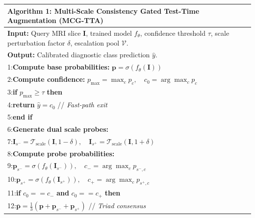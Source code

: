 \documentclass[journal]{IEEEtran}
\begin{document}
\begin{table}[h]
\centering
\begin{tabular}{p{}}
\toprule
\textbf{Algorithm 1: Multi-Scale Consistency Gated Test-Time Augmentation (MCG-TTA)} \\
\midrule
\textbf{Input:} Query MRI slice $\mathbf{I}$, trained model $f_\theta$, confidence threshold $\tau$, scale perturbation factor $\delta$, escalation pool $\mathcal{V}$. \\
\textbf{Output:} Calibrated diagnostic class prediction $\hat{y}$. \\
\midrule
1:\hspace{1em}\textbf{Compute base probabilities:} $\mathbf{p} = \sigma(f_\theta(\mathbf{I}))$ \\[0.2ex]
2:\hspace{1em}\textbf{Compute confidence:} $p_{\max} = \max_c p_c, \quad c_0 = \arg\max_c p_c$ \\[0.2ex]
3:\hspace{1em}\textbf{if} $p_{\max} \ge \tau$ \textbf{then} \\[0.2ex]
4:\hspace{2em}\textbf{return} $\hat{y} = c_0$ \hfill // \emph{Fast-path exit} \\[0.2ex]
5:\hspace{1em}\textbf{end if} \\[0.2ex]
6:\hspace{1em}\textbf{Generate dual scale probes:} \\[0.2ex]
7:\hspace{2em}$\mathbf{I}_{s^-} = \mathcal{T}_{\text{scale}}(\mathbf{I}, 1 - \delta), \quad \mathbf{I}_{s^+} = \mathcal{T}_{\text{scale}}(\mathbf{I}, 1 + \delta)$ \\[0.2ex]
8:\hspace{1em}\textbf{Compute probe probabilities:} \\[0.2ex]
9:\hspace{2em}$\mathbf{p}_{s^-} = \sigma(f_\theta(\mathbf{I}_{s^-})), \quad c_- = \arg\max_c p_{s^-, c}$ \\[0.2ex]
10:\hspace{1.5em}$\mathbf{p}_{s^+} = \sigma(f_\theta(\mathbf{I}_{s^+})), \quad c_+ = \arg\max_c p_{s^+, c}$ \\[0.2ex]
11:\hspace{0.5em}\textbf{if} $c_0 == c_-$ \textbf{and} $c_0 == c_+$ \textbf{then} \\[0.2ex]
12:\hspace{1.5em}$\bar{\mathbf{p}} = \frac{1}{3}(\mathbf{p} + \mathbf{p}_{s^-} + \mathbf{p}_{s^+})$ \hfill // \emph{Triad consensus} \\[0.2ex]

\end{tabular}
\end{table}
\end{document}
